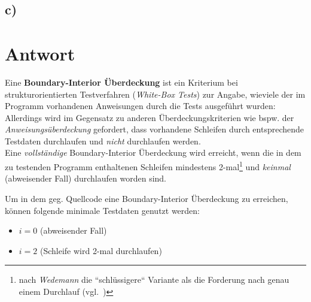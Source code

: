 \subsection*{c)}

\section*{Antwort}

Eine \textbf{Boundary-Interior Überdeckung} ist ein Kriterium bei strukturorientierten Testverfahren (\textit{White-Box Tests}) zur Angabe, wieviele der im Programm vorhandenen Anweisungen durch die Tests ausgeführt wurden: Allerdings wird im Gegensatz zu anderen Überdeckungskriterien wie bspw. der  \textit{Anweisungsüberdeckung} gefordert, dass vorhandene Schleifen durch entsprechende Testdaten durchlaufen und \textit{nicht} durchlaufen werden.\\

\noindent
Eine \textit{vollständige} Boundary-Interior Überdeckung wird erreicht, wenn die in dem zu testenden Programm enthaltenen Schleifen mindestens 2-mal\footnote{
nach \textit{Wedemann} die ``schlüssigere`` Variante als die Forderung nach genau einem Durchlauf (vgl.~\cite[52]{Wed09c})
} und  \textit{keinmal} (abweisender Fall)  durchlaufen worden sind.

\noindent
Um in dem geg. Quellcode eine  Boundary-Interior Überdeckung zu erreichen, können folgende minimale Testdaten genutzt werden:

\begin{itemize}
    \item $i=0$ (abweisender Fall)
    \item $i=2$ (Schleife wird 2-mal durchlaufen)
\end{itemize}
